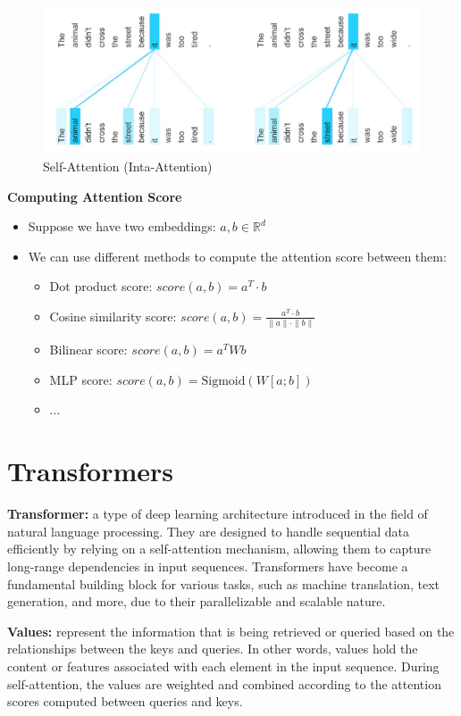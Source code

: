 \begin{figure}[h!t]
    \centering
    \includegraphics[width=0.75\linewidth]{selfattention.png}
    \caption{Self-Attention (Inta-Attention)}
    \label{fig:enter-label}
\end{figure}

\textbf{Computing Attention Score}
\begin{itemize}
    \item Suppose we have two embeddings: $a, b \in \mathbb{R}^d$
    \item We can use different methods to compute the attention score between them:
\begin{itemize}
    \item Dot product score: $score(a, b) = a^T \cdot b$
    \item Cosine similarity score: $score(a, b) = \frac{a^T \cdot b}{\|a\| \cdot \|b\|}$
    \item Bilinear score: $score(a, b) = a^T W b$
    \item MLP score: $score(a, b) = \text{Sigmoid}(W[a; b])$
    \item $\ldots$
\end{itemize}
\end{itemize}

\section{Transformers}

\begin{definition}
    \textbf{Transformer:} a type of deep learning architecture introduced in the field of natural language processing. They are designed to handle sequential data efficiently by relying on a self-attention mechanism, allowing them to capture long-range dependencies in input sequences. Transformers have become a fundamental building block for various tasks, such as machine translation, text generation, and more, due to their parallelizable and scalable nature.
\end{definition}

\begin{definition}
    \textbf{Values:} represent the information that is being retrieved or queried based on the relationships between the keys and queries. In other words, values hold the content or features associated with each element in the input sequence. During self-attention, the values are weighted and combined according to the attention scores computed between queries and keys.
\end{definition}

